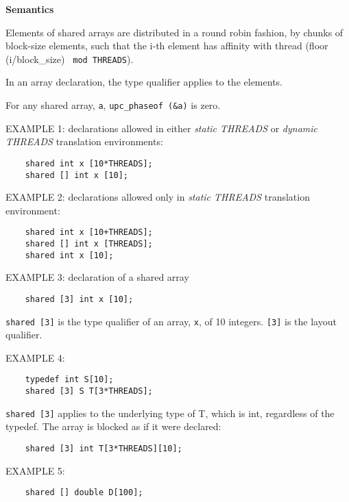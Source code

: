 {\bf Semantics} 

\np Elements of shared arrays are distributed in a round
    robin fashion, by chunks of block-size elements, such that the
    i-th element has affinity with thread (floor (i/block\_size) {\tt
    mod THREADS}).

\np In an array declaration, the type qualifier applies to
    the elements.

\np For any shared array, {\tt a}, {\tt upc\_phaseof (\&a)} is
    zero.

\np EXAMPLE 1: declarations allowed in either {\em static THREADS} or
    {\em dynamic THREADS} translation environments:

\begin{verbatim}
    shared int x [10*THREADS];  
    shared [] int x [10]; 
\end{verbatim}

\np EXAMPLE 2: declarations allowed only in {\em static THREADS} translation
    environment:

\begin{verbatim}
    shared int x [10+THREADS];  
    shared [] int x [THREADS];  
    shared int x [10]; 
\end{verbatim}

\np EXAMPLE 3: declaration of a shared array 

\begin{verbatim}
    shared [3] int x [10];
\end{verbatim}

   {\tt shared [3]} is the type qualifier of an array, {\tt x}, of 10
   integers. {\tt [3]} is the layout qualifier.

\np EXAMPLE 4: 

\begin{verbatim}
    typedef int S[10]; 
    shared [3] S T[3*THREADS]; 
\end{verbatim}
   

   {\tt shared [3]} applies to the underlying type of T, which is int,
   regardless of the typedef.  The array is blocked as if it were
   declared:

\begin{verbatim}
    shared [3] int T[3*THREADS][10]; 
\end{verbatim}

\np EXAMPLE 5: 

\begin{verbatim}
    shared [] double D[100]; 
\end{verbatim}
    

